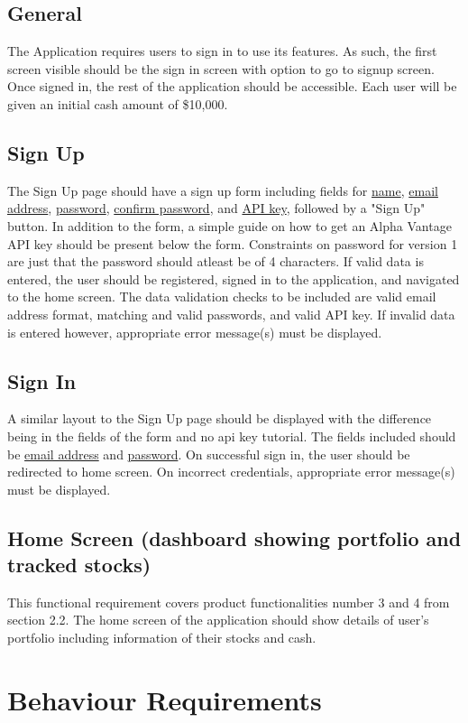 \documentclass[12 pt, a4paper]{report}
\begin{document}
	\subsection{General}
	The Application requires users to sign in to use its features. As such, the first screen visible should be the sign in screen with option to go to signup screen. Once signed in, the rest of the application should be accessible.
	Each user will be given an initial cash amount of \$10,000.
	\subsection{Sign Up}
	The Sign Up page should have a sign up form including fields for \underline{name}, \underline{email address}, \underline{password}, \underline{confirm password}, and \underline{API key}, followed by a "Sign Up" button. In addition to the form, a simple guide on how to get an Alpha Vantage API key should be present below the form. Constraints on password for version 1 are just that the password should atleast be of 4 characters. If valid data is entered, the user should be registered, signed in to the application, and navigated to the home screen. The data validation checks to be included are valid email address format, matching and valid passwords, and valid API key. If invalid data is entered however, appropriate error message(s) must be displayed.

	
	\subsection{Sign In}
	A similar layout to the Sign Up page should be displayed with the difference being in the fields of the form and no api key tutorial. The fields included should be \underline{email address} and \underline{password}. On successful sign in, the user should be redirected to home screen. On incorrect credentials, appropriate error message(s) must be displayed.

	
	\subsection{Home Screen (dashboard showing portfolio and tracked stocks)}
	This functional requirement covers product functionalities number 3 and 4 from section 2.2. The home screen of the application should show details of user's portfolio including information of their stocks and cash.

	\section {Behaviour Requirements}
\end{document}
